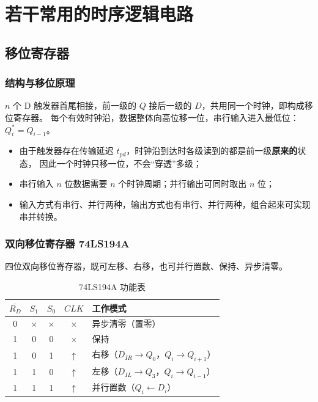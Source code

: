 \section{若干常用的时序逻辑电路}
\subsection{移位寄存器}
\subsubsection{结构与移位原理}
$n$ 个 D 触发器首尾相接，前一级的 $Q$ 接后一级的 $D$，共用同一个时钟，即构成移位寄存器。
每个有效时钟沿，数据整体向高位移一位，串行输入进入最低位：$Q_i^*=Q_{i-1}$。

\begin{itemize}
    \item 由于触发器存在传输延迟 $t_{pd}$，时钟沿到达时各级读到的都是前一级\textbf{原来的}状态，
    因此一个时钟只移一位，不会“穿透”多级；
    \item 串行输入 $n$ 位数据需要 $n$ 个时钟周期；并行输出可同时取出 $n$ 位；
    \item 输入方式有串行、并行两种，输出方式也有串行、并行两种，组合起来可实现串并转换。
\end{itemize}

\subsubsection{双向移位寄存器 74LS194A}
四位双向移位寄存器，既可左移、右移，也可并行置数、保持、异步清零。

\begin{table}[!htbp]
\centering
\caption{74LS194A 功能表}
\begin{tabular}{cc|cc|l}
\toprule
$\overline{R_D}$ & $S_1$ & $S_0$ & $CLK$ & 工作模式 \\
\midrule
0 & $\times$ & $\times$ & $\times$ & 异步清零（置零） \\
1 & 0 & 0 & $\times$ & 保持 \\
1 & 0 & 1 & $\uparrow$ & 右移（$D_{IR}\rightarrow Q_0$，$Q_i\rightarrow Q_{i+1}$） \\
1 & 1 & 0 & $\uparrow$ & 左移（$D_{IL}\rightarrow Q_3$，$Q_i\rightarrow Q_{i-1}$） \\
1 & 1 & 1 & $\uparrow$ & 并行置数（$Q_i\leftarrow D_i$） \\
\bottomrule
\end{tabular}
\end{table}

